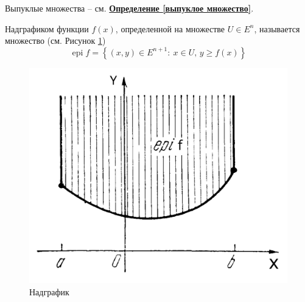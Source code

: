
Выпуклые множества -- см. \textbf{\hyperref[выпуклое множество]{Определение \ref{выпуклое множество}}}.

\begin{multicols}{2}
\begin{definition}
	Надграфиком функции $f(x)$, определенной на множестве $U\in E^n$, называется множество (см. Рисунок \ref{fig:teor9})
	\begin{equation*}
		\operatorname{epi} f = \left\{ (x,y)\in E^{n+1}:\: x\in U,\,y\geq f(x) \right\}
	\end{equation*}
	\columnbreak
	\begin{figure}[H]
	\centering
	\includegraphics[width=.6\linewidth]{img/teor9}
	\caption{Надграфик}
	\label{fig:teor9}
	\end{figure}
\end{definition}
\end{multicols}

